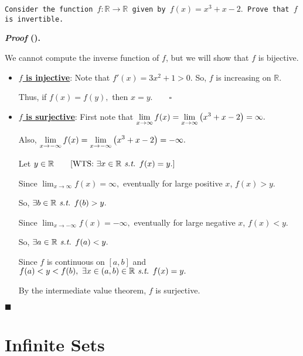 \documentclass[12pt,a4paper]{article}
\newcounter{nprf}[subsection]
\newenvironment*{prf}{\par\indent\textbf{\textit{Proof} (\stepcounter{nprf}\thenprf). }\par }{\par\hfill $\blacksquare$\par}
\def\R{{\mathbb{R}}}
\def\st{\emph{ s.t. }}
\begin{document}
\begin{framed}
\noindent\texttt{Consider the function $f:\R\to\R$ given by $f(x)=x^3+x-2.$ Prove that $f$ is invertible.}
\begin{prf}
	We cannot compute the inverse function of $f$, but we will show that $f$ is bijective.
	\begin{itemize}
		\item \underline{\textbf{$f$ is injective}}: Note that $f'(x)=3x^2+1>0.$ So, $f$ is increasing on $\R.$\par Thus, if $f(x)=f(y),$ then $x=y.\qquad\square$
		\item \underline{\textbf{$f$ is surjective}}: First note that $\displaystyle\lim_{x\to\infty}f(x)=\lim_{x\to\infty}\qty(x^3+x-2)=\infty.$\par Also, $\displaystyle\lim_{x\to-\infty}f(x)=\lim_{x\to-\infty}\qty(x^3+x-2)=-\infty.$\par Let $y\in\R\qquad[\text{WTS: }\exists x\in\R\st f(x)=y.]$\par Since $\displaystyle\lim_{x\to\infty}f(x)=\infty,$ eventually for large positive $x$, $f(x)>y.$\par So, $\exists b\in\R\st f(b)>y. $\par Since $\displaystyle\lim_{x\to-\infty}f(x)=-\infty,$ eventually for large negative $x$, $f(x)<y.$\par So, $\exists a\in\R\st f(a)<y.$\par Since $f$ is continuous on $[a,b]$ and $f(a)<y<f(b),\ \exists x\in(a,b)\in\R\st f(x)=y.$ \par By the intermediate value theorem, $f$ is surjective. 
	\end{itemize}
\end{prf}
\end{framed}







\section{Infinite Sets}
\end{document}
